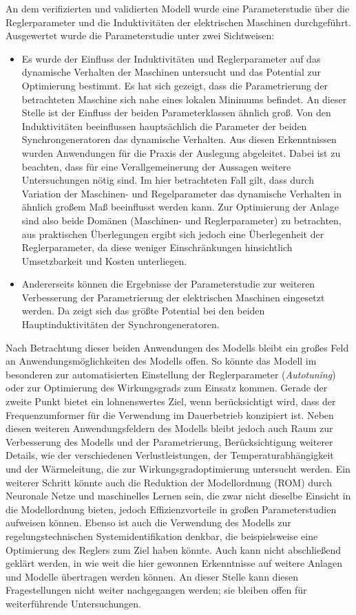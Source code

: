 An dem verifizierten und validierten Modell wurde eine Parameterstudie über die Reglerparameter und die Induktivitäten der elektrischen Maschinen durchgeführt. Ausgewertet wurde die Parameterstudie unter zwei Sichtweisen:\begin{itemize}
	\item Es wurde der Einfluss der Induktivitäten und Reglerparameter auf das dynamische Verhalten der Maschinen untersucht und das Potential zur Optimierung bestimmt. Es hat sich gezeigt, dass die Parametrierung der betrachteten Maschine sich nahe eines lokalen Minimums befindet. An dieser Stelle ist der Einfluss der beiden Parameterklassen ähnlich groß. Von den Induktivitäten beeinflussen hauptsächlich die Parameter der beiden Synchrongeneratoren das dynamische Verhalten. Aus diesen Erkenntnissen wurden Anwendungen für die Praxis der Auslegung abgeleitet. Dabei ist zu beachten, dass für eine Verallgemeinerung der Aussagen weitere Untersuchungen nötig sind. Im hier betrachteten Fall gilt, dass durch Variation der Maschinen- und Regelparameter das dynamische Verhalten in ähnlich großem Maß beeinflusst werden kann. Zur Optimierung der Anlage sind also beide Domänen (Maschinen- und Reglerparameter) zu betrachten, aus praktischen Überlegungen ergibt sich jedoch eine Überlegenheit der Reglerparameter, da diese weniger Einschränkungen hinsichtlich Umsetzbarkeit und Kosten unterliegen.
	\item Andererseits können die Ergebnisse der Parameterstudie zur weiteren Verbesserung der Parametrierung der elektrischen Maschinen eingesetzt werden. Da zeigt sich das größte Potential bei den beiden Hauptinduktivitäten der Synchrongeneratoren.
\end{itemize}

Nach Betrachtung dieser beiden Anwendungen des Modells bleibt ein großes Feld an Anwendungsmöglichkeiten des Modells offen. So könnte das Modell im besonderen zur automatisierten Einstellung der Reglerparameter (\emph{Autotuning}) oder zur Optimierung des Wirkungsgrads zum Einsatz kommen. Gerade der zweite Punkt bietet ein lohnenswertes Ziel, wenn berücksichtigt wird, dass der Frequenzumformer für die Verwendung im Dauerbetrieb konzipiert ist. Neben diesen weiteren Anwendungsfeldern des Modells bleibt jedoch auch Raum zur Verbesserung des Modells und der Parametrierung, Berücksichtigung weiterer Details, wie der verschiedenen Verlustleistungen, der Temperaturabhängigkeit und der Wärmeleitung, die zur Wirkungsgradoptimierung untersucht werden. Ein weiterer Schritt könnte auch die Reduktion der Modellordnung (ROM) durch Neuronale Netze und maschinelles Lernen sein, die zwar nicht dieselbe Einsicht in die Modellordnung bieten, jedoch Effizienzvorteile in großen Parameterstudien aufweisen können. Ebenso ist auch die Verwendung des Modells zur regelungstechnischen Systemidentifikation denkbar, die beispielsweise eine Optimierung des Reglers zum Ziel haben könnte. Auch kann nicht abschließend geklärt werden, in wie weit die hier gewonnen Erkenntnisse auf weitere Anlagen und Modelle übertragen werden können. An dieser Stelle kann diesen Fragestellungen nicht weiter nachgegangen werden; sie bleiben offen für weiterführende Untersuchungen.
